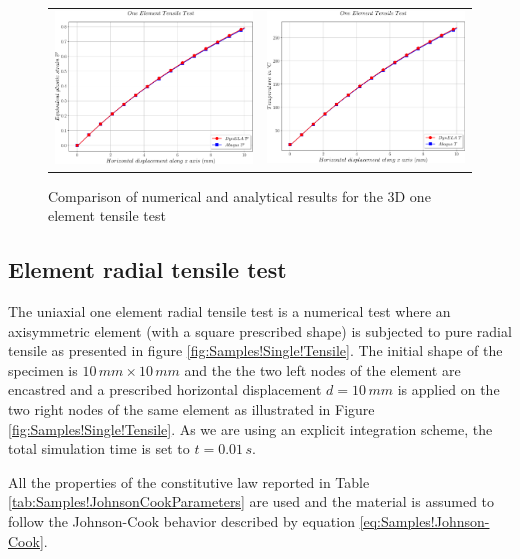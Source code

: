 \begin{figure}[h]
\begin{centering}
\begin{tabular}{cc}
\includegraphics[width=0.45\columnwidth]{Figures/Samples/Element/Tensile3D_plasticStrain} & \includegraphics[width=0.45\columnwidth]{Figures/Samples/Element/Tensile3D_temperature}\tabularnewline
\end{tabular}
\par\end{centering}
\caption{Comparison of numerical and analytical results for the 3D one element
tensile test\label{fig:Samples!Single!Tensile-Comparison-3D}}
\end{figure}


\subsection{Element radial tensile test}

The uniaxial one element radial tensile test is a numerical test where
an axisymmetric element (with a square prescribed shape) is subjected
to pure radial tensile as presented in figure \ref{fig:Samples!Single!Tensile}.
The initial shape of the specimen is $10\,mm\times10\,mm$ and the
the two left nodes of the element are encastred and a prescribed horizontal
displacement $d=10\,mm$ is applied on the two right nodes of the
same element as illustrated in Figure \ref{fig:Samples!Single!Tensile}.
As we are using an explicit integration scheme, the total simulation
time is set to $t=0.01\,s$. 

All the properties of the constitutive law reported in Table \ref{tab:Samples!JohnsonCookParameters}
are used and the material is assumed to follow the Johnson-Cook behavior
described by equation \ref{eq:Samples!Johnson-Cook}. 

